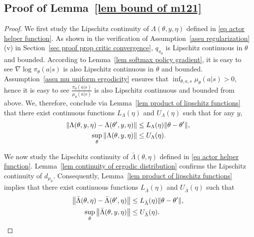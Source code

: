 \documentclass[twoside,11pt]{article}
\numberwithin{assucounter}{section}
\begin{document}
\subsection{Proof of Lemma~\ref{lem bound of m121}}
\label{sec proof lem bound of m121}
\lemboundofmonetwoone*
\begin{proof}
  We first study the Lipschitz continuity of $\Lambda(\theta, y, \eta)$ defined in \eqref{eq actor helper function}.
  As shown in the verification of Assumption~\ref{assu regularization} (v) in Section~\ref{sec proof prop critic convergence},
  $q_{\pi_\theta}$ is Lipschitz continuous in $\theta$ and bounded.
  According to Lemma~\ref{lem softmax policy gradient},
  it is easy to see $\nabla \log \pi_\theta(a|s)$ is also Lipschitz continuous in $\theta$ and bounded.
  Assumption~\ref{assu mu uniform ergodicity} ensures that $\inf_{\theta, a, s} \mu_\theta(a|s) > 0$,
  hence it is easy to see $\frac{\pi_\theta(a|s)}{\mu_\theta(a|s)}$ is also Lipschitz continuous and bounded from above.
  We, therefore,
  conclude via Lemma~\ref{lem product of lipschitz functions} that there exist continuous functions $L_\Lambda(\eta)$ and $U_{\Lambda}(\eta)$ such that
  for any $y$,
  \begin{align}
    \norm{\Lambda(\theta, y, \eta) - \Lambda(\theta', y, \eta)} &\leq L_{\Lambda}(\eta) \norm{\theta -\theta'}, \\
    \sup_{\theta} \norm{\Lambda(\theta, y, \eta)} &\leq U_{\Lambda}(\eta).
  \end{align}

  We now study the Lipschitz continuity of $\bar \Lambda(\theta, \eta)$ defined in \eqref{eq actor helper function}.
  Lemma~\ref{lem continuity of ergodic distribution} confirms the Lipschitz continuity of $d_{\mu_\theta}$.
  Consequently,
  Lemma~\ref{lem product of lipschitz functions} implies that 
  there exist continuous functions $L_{\bar \Lambda}(\eta)$ and $U_{\bar \Lambda}(\eta)$ such that
  \begin{align}
    \norm{\bar \Lambda(\theta, \eta) - \bar \Lambda(\theta', \eta)} &\leq L_{\bar \Lambda}(\eta) \norm{\theta -\theta'}, \\
    \sup_{\theta} \norm{\bar \Lambda(\theta, y, \eta)} &\leq U_{\bar \Lambda}(\eta).
  \end{align}


\end{proof}
\end{document}

